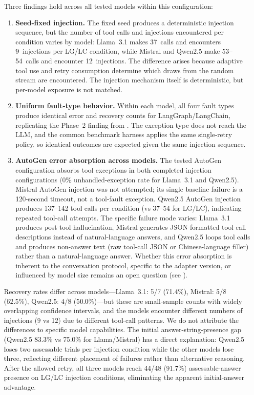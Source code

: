\documentclass[make,article,submit,moreauthors,pdftex]{mdpi}
\newcommand{\Wrev}[1]{\texorpdfstring{{\color{RevisionOrange}#1}}{#1}}
\begin{document}
Three findings \Wrev{hold across all tested models within this configuration:}

\begin{enumerate}
  \item {\textbf{Seed-fixed injection.} The fixed seed produces a deterministic injection sequence, but the number of tool calls and injections encountered per condition varies by model: Llama~3.1 makes 37~calls and encounters 9~injections per LG/LC condition, while Mistral and Qwen2.5 make 53--54~calls and encounter 12~injections. The difference arises because adaptive tool use and retry consumption determine which draws from the random stream are encountered. The injection mechanism itself is deterministic, but per-model exposure is not matched.}
  \item {\textbf{Uniform fault-type behavior.} Within each model, all four fault types produce identical error and recovery counts for LangGraph/LangChain, replicating the Phase~2 finding from . The exception type does not reach the LLM, and the common benchmark harness applies the same single-retry policy, so identical outcomes are expected given the same injection sequence.}
  \item {\textbf{AutoGen error absorption across models.} \Wrev{The tested AutoGen configuration} absorbs tool exceptions in both completed injection configurations (0\% unhandled-exception rate for Llama~3.1 and Qwen2.5). Mistral AutoGen injection was not attempted; its single baseline failure is a 120-second timeout, not a tool-fault exception. Qwen2.5 AutoGen injection produces 137--142 tool calls per condition (vs 37--54 for LG/LC), indicating repeated tool-call attempts. The specific failure mode varies: Llama~3.1 produces post-tool hallucination, Mistral generates JSON-formatted tool-call descriptions instead of natural-language answers, and Qwen2.5 loops tool calls and produces non-answer text (raw tool-call JSON or Chinese-language filler) rather than a natural-language answer. Whether this error absorption is inherent to the conversation protocol, specific to the adapter version, or influenced by model size remains an open question (see ).}
\end{enumerate}

{Recovery rates differ across models---Llama~3.1: 5/7 (71.4\%), Mistral: 5/8 (62.5\%), Qwen2.5: 4/8 (50.0\%)---but these are small-sample counts with widely overlapping confidence intervals, and the models encounter different numbers of injections (9 vs 12) due to different tool-call patterns. We do not attribute the differences to specific model capabilities. The initial answer-string-presence gap (Qwen2.5 83.3\% vs 75.0\% for Llama/Mistral) has a direct explanation: Qwen2.5 loses two assessable trials per injection condition while the other models lose three, reflecting different placement of failures rather than alternative reasoning. After the allowed retry, all three models reach 44/48 (91.7\%) assessable-answer presence on LG/LC injection conditions, eliminating the apparent initial-answer advantage.}
\end{document}
